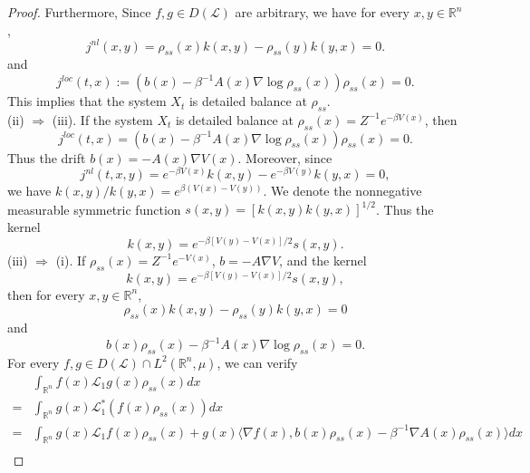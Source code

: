 \documentclass[10pt]{article}
\theoremstyle{definition}
\theoremstyle{remark}
\numberwithin{equation}{section}
\begin{document}
\begin{proof}
Furthermore, Since $f,g \in D(\mathcal{L})$ are arbitrary, we have for every $x,y \in \mathbb{R}^n$,
\begin{equation}
    j^{nl}(x,y)= \rho_{ss}(x)k(x,y) - \rho_{ss}(y)k(y,x) = 0.
\end{equation}
and
\begin{equation*}
    j^{loc}(t,x) := (b(x) - \beta^{-1} A(x)\nabla \log \rho_{ss}(x))\rho_{ss}(x) = 0.
\end{equation*}
This implies that the system $X_t$ is detailed balance at $\rho_{ss}$.\\
(ii) $\Rightarrow$ (iii). If the system $X_t$ is detailed balance at $\rho_{ss}(x) = Z^{-1} e^{-\beta V(x)}$, then 
\begin{equation*}
    j^{loc}(t,x) = (b(x) - \beta^{-1}A(x) \nabla \log\rho_{ss}(x))\rho_{ss}(x) = 0.
\end{equation*}
Thus the drift $b(x) = -A(x)\nabla V(x)$. 
Moreover, since 
\begin{equation*}
    j^{nl}(t,x,y) =e^{-\beta V(x)}k(x,y) - e^{-\beta V(y)}k(y,x) =0,
\end{equation*}
we have $k(x,y)/k(y,x) = e^{\beta(V(x) - V(y))}$.
We denote the nonnegative measurable symmetric function $s(x,y) = [k(x,y)k(y,x)]^{1/2}$.
Thus the kernel
\begin{equation*}
    k(x,y) = e^{-\beta[V(y)-V(x)]/2} s(x,y).
\end{equation*}
(iii) $\Rightarrow$ (i). If $\rho_{ss}(x) = Z^{-1} e^{-V(x)}$, $b = -A\nabla V$, and the kernel
\begin{equation*}
    k(x,y) = e^{-\beta[V(y)-V(x)]/2} s(x,y),
\end{equation*}
then for every $x,y \in \mathbb{R}^n$,
\begin{equation}
    \rho_{ss}(x)k(x,y) - \rho_{ss}(y)k(y,x) = 0
\end{equation}
and
\begin{equation*}
    b(x)\rho_{ss}(x) - \beta^{-1} A(x)\nabla \log \rho_{ss}(x) = 0.
\end{equation*}
For every $f,g \in D(\mathcal{L}) \cap L^2(\mathbb{R}^n, \mu)$, we can verify
\begin{align*}
    & \int_{\mathbb{R}^n} f(x) \mathcal{L}_{1}g(x) \rho_{ss}(x)dx \\
    = & \int_{\mathbb{R}^n} g(x) \mathcal{L}_{1}^{\ast}(f(x) \rho_{ss}(x))dx \\
    = & \int_{\mathbb{R}^n} g(x) \mathcal{L}_{1}f(x) \rho_{ss}(x) + g(x)\langle \nabla f(x), b(x)\rho_{ss}(x) - \beta^{-1} \nabla A(x) \rho_{ss}(x) \rangle dx \\

\end{align*}
\end{proof}
\end{document}
